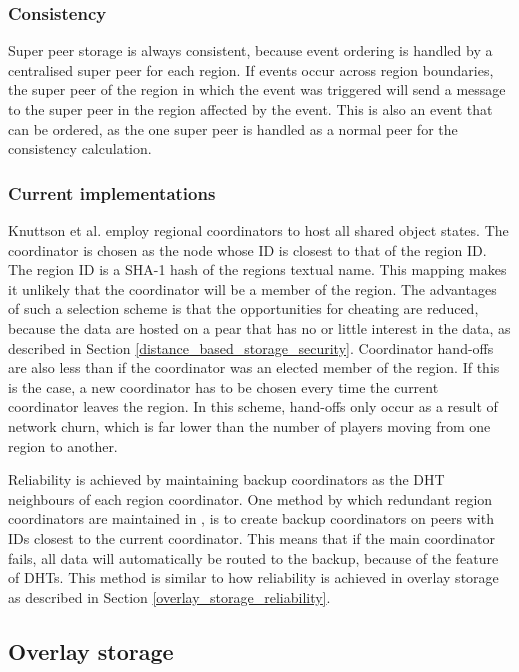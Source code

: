 \documentclass[10pt,a4paper,journal,cspaper,compsoc]{IEEEtran}
\begin{document}
\subsubsection{Consistency}
Super peer storage is always consistent, because event ordering is handled by a centralised super peer for each region. If events occur across region
boundaries, the super peer of the region in which the event was triggered will send a message to the super peer in the region affected by the event.
This is also an event that can be ordered, as the one super peer is handled as a normal peer for the consistency calculation.

\subsubsection{Current implementations}

Knuttson et al. \cite{knutsson_p2p_first} employ regional coordinators to host all shared object states. The coordinator is chosen as the node whose
ID is closest to that of the region ID. The region ID is a SHA-1 hash of the regions textual name. This mapping makes it unlikely that the
coordinator will be a member of the region. The advantages of such a selection scheme is that the opportunities for cheating are reduced, because the
data are hosted on a pear that has no or little interest in the data, as described in Section \ref{distance_based_storage_security}. Coordinator
hand-offs are also less than if the coordinator was an elected member of the region. If this is the case, a new coordinator has to be chosen every
time the current coordinator leaves the region. In this scheme, hand-offs only occur as a result of network churn, which is far lower than the number
of players moving from one region to another.

Reliability is achieved by maintaining backup coordinators as the DHT neighbours of each region coordinator. One method by which redundant region
coordinators are maintained in \cite{knutsson_p2p_first}, is to create backup coordinators on peers with IDs closest to the current coordinator. This
means that if the main coordinator fails, all data will automatically be routed to the backup, because of the feature of DHTs. This method is similar
to how reliability is achieved in overlay storage as described in Section \ref{overlay_storage_reliability}.

\subsection{Overlay storage}
\label{overlay_storage}
\end{document}

